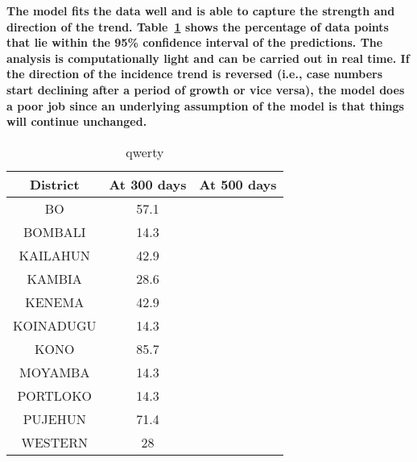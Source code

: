 \documentclass[a4paper,12pt]{article}
\begin{document}
\textbf{The model fits the data well and is able to capture the
  strength and direction of the trend. Table~\ref{tab:fitgoodness}
  shows the percentage of data points that lie within the 95\%
  confidence interval of the predictions. The analysis is computationally
  light and can be carried out in real time. \newline If the direction of the incidence trend is reversed
  (i.e., case numbers start declining after a period of growth or vice
  versa), the model does a poor job since an underlying assumption of
  the model is that things will continue unchanged.}



\begin{center}
  \begin{table}
  \begin{tabular}{ccc}
    District & At 300 days & At 500 days \\
    \hline
    BO &  57.1 & \\
    
    BOMBALI & 14.3 & \\
    
    KAILAHUN & 42.9 & \\
    
    KAMBIA & 28.6 & \\
    
    KENEMA & 42.9 & \\
    
    KOINADUGU & 14.3 & \\
    
    KONO & 85.7 & \\
    
    MOYAMBA & 14.3 & \\
    
    PORTLOKO & 14.3 & \\
    
    PUJEHUN & 71.4 & \\
    
    WESTERN & 28 & \\
\end{tabular}
    \caption{qwerty}
    \label{tab:fitgoodness}
  
  \end{table}
\end{center}





  
\end{document}
